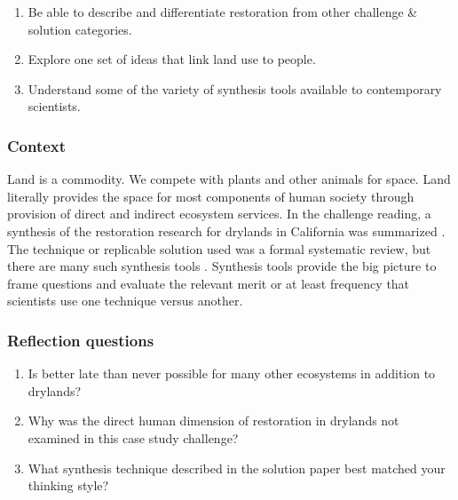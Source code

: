 \documentclass[
]{book}
\providecommand{\tightlist}{%
  \setlength{\itemsep}{0pt}\setlength{\parskip}{0pt}}
\begin{document}
\begin{enumerate}
\def\labelenumi{\arabic{enumi}.}
\tightlist
\item
  Be able to describe and differentiate restoration from other challenge \& solution categories.
\item
  Explore one set of ideas that link land use to people.\\
\item
  Understand some of the variety of synthesis tools available to contemporary scientists.
\end{enumerate}

\hypertarget{context-3}{%
\subsubsection*{Context}\label{context-3}}

Land is a commodity. We compete with plants and other animals for space. Land literally provides the space for most components of human society through provision of direct and indirect ecosystem services. In the challenge reading, a synthesis of the restoration research for drylands in California was summarized \citep{RN5980}. The technique or replicable solution used was a formal systematic review, but there are many such synthesis tools \citep{RN3216}. Synthesis tools provide the big picture to frame questions and evaluate the relevant merit or at least frequency that scientists use one technique versus another.

\hypertarget{reflection-questions-3}{%
\subsubsection*{Reflection questions}\label{reflection-questions-3}}

\begin{enumerate}
\def\labelenumi{\arabic{enumi}.}
\tightlist
\item
  Is better late than never possible for many other ecosystems in addition to drylands?\\
\item
  Why was the direct human dimension of restoration in drylands not examined in this case study challenge?\\
\item
  What synthesis technique described in the solution paper best matched your thinking style?
\end{enumerate}
\end{document}
